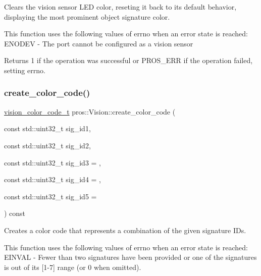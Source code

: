 Clears the vision sensor L\+ED color, reseting it back to its default behavior, displaying the most prominent object signature color.

This function uses the following values of errno when an error state is reached\+: E\+N\+O\+D\+EV -\/ The port cannot be configured as a vision sensor

\begin{DoxyReturn}{Returns}
1 if the operation was successful or P\+R\+O\+S\+\_\+\+E\+RR if the operation failed, setting errno. 
\end{DoxyReturn}
\mbox{\label{classpros_1_1Vision_ab50bcfb700b591e2f1654962baac400f}} 
\subsubsection{\texorpdfstring{create\+\_\+color\+\_\+code()}{create\_color\_code()}}
{\footnotesize\ttfamily \hyperlink{vision_8h_a71f2011a47e95558bb534b05c16c7f2b}{vision\+\_\+color\+\_\+code\+\_\+t} pros\+::\+Vision\+::create\+\_\+color\+\_\+code (\begin{DoxyParamCaption}\item[{const std\+::uint32\+\_\+t}]{sig\+\_\+id1,  }\item[{const std\+::uint32\+\_\+t}]{sig\+\_\+id2,  }\item[{const std\+::uint32\+\_\+t}]{sig\+\_\+id3 = {},  }\item[{const std\+::uint32\+\_\+t}]{sig\+\_\+id4 = {},  }\item[{const std\+::uint32\+\_\+t}]{sig\+\_\+id5 = {} }\end{DoxyParamCaption}) const}

Creates a color code that represents a combination of the given signature I\+Ds.

This function uses the following values of errno when an error state is reached\+: E\+I\+N\+V\+AL -\/ Fewer than two signatures have been provided or one of the signatures is out of its \mbox{[}1-\/7\mbox{]} range (or 0 when omitted).


